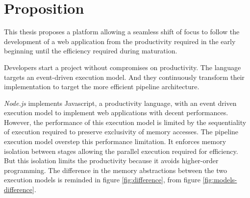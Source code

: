 \section{Proposition} \label{chapter4:proposition}

This thesis proposes a platform allowing a seamless shift of focus to follow the development of a web application from the productivity required in the early beginning until the efficiency required during maturation.

Developers start a project without compromises on productivity.
The language targets an event-driven execution model.
And they continuously transform their implementation to target the more efficient pipeline architecture.



\textit{Node.js} implements Javascript, a productivity language, with an event driven execution model to implement web applications with decent performances.
However, the performance of this execution model is limited by the sequentiality of execution required to preserve exclusivity of memory accesses.
The pipeline execution model overstep this performance limitation.
It enforces memory isolation between stages allowing the parallel execution required for efficiency.
But this isolation limits the productivity because it avoids higher-order programming.
The difference in the memory abstractions between the two execution models is reminded in figure \ref{fig:difference}, from figure \ref{fig:models-difference}.

